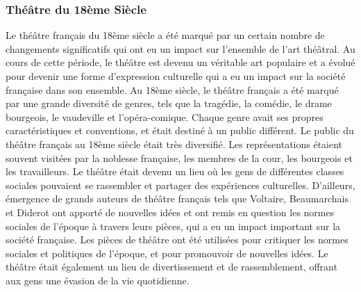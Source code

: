 \documentclass[UTF8,a4paper,12pt]{ctexart}
\numberwithin{equation}{section}
\newcommand{\mycite}[1]{\cite{#1}}
\begin{document}
\subsubsection{Théâtre du 18ème Siècle}
Le théâtre français du 18ème siècle a été marqué par un certain nombre de changements significatifs qui ont eu un impact sur l'ensemble de l'art théâtral. Au cours de cette période, le théâtre est devenu un véritable art populaire et a évolué pour devenir une forme d'expression culturelle qui a eu un impact sur la société française dans son ensemble. Au 18ème siècle, le théâtre français a été marqué par une grande diversité de genres, tels que la tragédie, la comédie, le drame bourgeois, le vaudeville et l'opéra-comique. Chaque genre avait ses propres caractéristiques et conventions, et était destiné à un public différent. Le public du théâtre français au 18ème siècle était très diversifié. Les représentations étaient souvent visitées par la noblesse française, les membres de la cour, les bourgeois et les travailleurs. Le théâtre était devenu un lieu où les gens de différentes classes sociales pouvaient se rassembler et partager des expériences culturelles. D'ailleurs, émergence de grands auteurs de théâtre français tels que Voltaire, Beaumarchais et Diderot ont apporté de nouvelles idées et ont remis en question les normes sociales de l'époque à travers leurs pièces, qui a eu un impact important sur la société française\mycite{carlson1998voltaire}. Les pièces de théâtre ont été utilisées pour critiquer les normes sociales et politiques de l'époque, et pour promouvoir de nouvelles idées. Le théâtre était également un lieu de divertissement et de rassemblement, offrant aux gens une évasion de la vie quotidienne.
\end{document}
